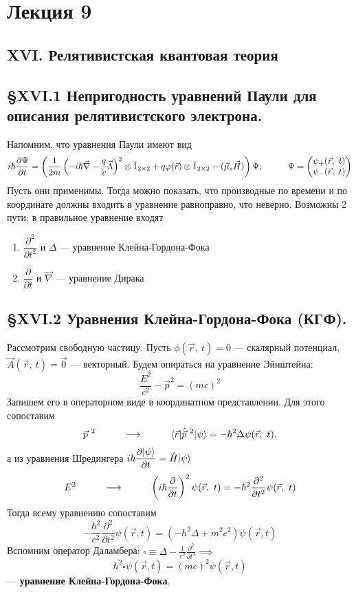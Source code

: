 \section{Лекция 9}
\subsection{XVI. Релятивистская квантовая теория}
\subsection{\S XVI.1 Непригодность уравнений Паули для описания релятивистского электрона.}
Напомним, что уравнения Паули имеют вид
\[
i\hbar\dfrac{\partial\Psi}{\partial t} = \left(\dfrac{1}{2m}\left(-i\hbar\vec{\nabla}-\dfrac{q}{c}\vec{\Lambda}\right)^2\otimes \hat{1}_{2\times 2} + q \varphi(\vec{r})\otimes\hat{1}_{2\times 2} - (\vec{\mu}_s\vec{H})\right)\Psi, \hspace*{1cm} \Psi = \begin{pmatrix}
	\psi_+(\vec{r},~t)\\
	\psi_-(\vec{r},~t)\\
\end{pmatrix}
\]
Пусть они применимы. Тогда можно показать, что производные по времени и по координате должны входить в уравнение равноправно, что неверно. Возможны 2 пути: в правильное уравнение входят
\begin{enumerate}
	\item $\dfrac{\partial^2}{\partial t^2}$ и $\Delta$ --- уравнение Клейна-Гордона-Фока
	\item $\dfrac{\partial}{\partial 
		t}$ и $\vec{\nabla}$ --- уравнение Дирака
\end{enumerate}




\subsection{\S XVI.2 Уравнения Клейна-Гордона-Фока (КГФ).}
Рассмотрим свободную частицу. Пусть $\phi(\vec{r},~ t)=0$ --- скалярный потенциал, $\vec{A}(\vec{r},~t)=\vec{0}$ --- векторный. Будем опираться на уравнение Эйнштейна: 
\[
\dfrac{E^2}{c^2} - \vec{p}^2 = (mc)^2
\]
Запишем его в операторном виде в координатном представлении. Для этого сопоставим 
\[
\vec{p}^{~2} \hspace*{1cm} \longrightarrow \hspace*{1cm} \langle \vec{r} | \hat{\vec{p}}^{~2} | \psi \rangle = -\hbar^2 \Delta\psi(\vec{r},~ t),
\]
а из уравнения Шредингера $i\hbar\dfrac{\partial| \psi \rangle}{\partial t} = \hat{H}| \psi \rangle$
\[
E^2 \hspace*{1cm} \longrightarrow \hspace*{1cm} \left(i\hbar \dfrac{\partial}{\partial t}\right)^2\psi(\vec{r},~t) = -\hbar^2\dfrac{\partial^2}{\partial t^2}\psi(\vec{r},~t)
\]
Тогда всему уравнению сопоставим
\[
-\frac{\hbar^2}{c^2} \frac{\partial^2}{\partial t^2} \psi(\vec{r}, t) = (-\hbar^2 \Delta + m^2 c^2) \psi(\vec{r}, t)
\]
Вспомним оператор Даламбера: $\square \equiv \Delta - \frac{1}{c^2} \frac{\partial^2}{\partial t^2} \implies$
\[
\hbar^2 \square \psi(\vec{r}, t) = (mc)^2 \psi(\vec{r}, t)
\]
--- \textbf{уравнение Клейна-Гордона-Фока}.

